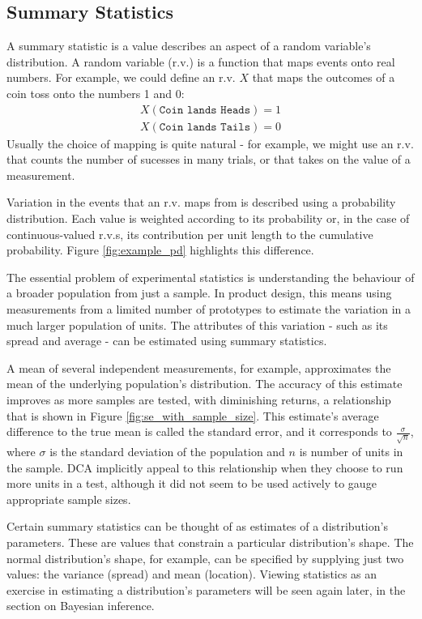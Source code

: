 \documentclass[11pt,a4paper,article]{memoir} %
\begin{document}
\subsection*{Summary Statistics}
 A summary statistic is a value describes an aspect of a random variable's distribution. A random variable (r.v.) is a function that maps events onto real numbers. For example, we could define an r.v. $X$ that maps the outcomes of a coin toss onto the numbers 1 and 0:
 \begin{align}
	X(\texttt{Coin lands Heads}) = 1 \\
	X(\texttt{Coin lands Tails}) =0
 \end{align}
Usually the choice of mapping is quite natural - for example, we might use an r.v. that counts the number of sucesses in many trials, or that takes on the value of a measurement.
\par
Variation in the events that an r.v. maps from is described using a probability distribution. Each value is weighted according to its probability or, in the case of continuous-valued r.v.s, its contribution per unit length to the cumulative probability. Figure \ref{fig:example_pd} highlights this difference.
\par
The essential problem of experimental statistics is understanding the behaviour of a broader population from just a sample. In product design, this means using measurements from a limited number of prototypes to estimate the variation in a much larger population of units. The attributes of this variation - such as its spread and average - can be estimated using summary statistics.
 \par
A mean of several independent measurements, for example, approximates the mean of the underlying population's distribution. The accuracy of this estimate improves as more samples are tested, with diminishing returns, a relationship that is shown in Figure \ref{fig:se_with_sample_size}. This estimate's average difference to the true mean is called the standard error, and it corresponds to $\frac{\sigma}{\sqrt{n}}$, where $\sigma$ is the standard deviation of the population and $n$ is number of units in the sample. DCA implicitly appeal to this relationship when they choose to run more units in a test, although it did not seem to be used actively to gauge appropriate sample sizes.

Certain summary statistics can be thought of as estimates of a distribution's parameters. These are values that constrain a particular distribution's shape. The normal distribution's shape, for example, can be specified by supplying just two values: the variance (spread) and mean (location). Viewing statistics as an exercise in estimating a distribution's parameters will be seen again later, in the section on Bayesian inference.
\end{document}
